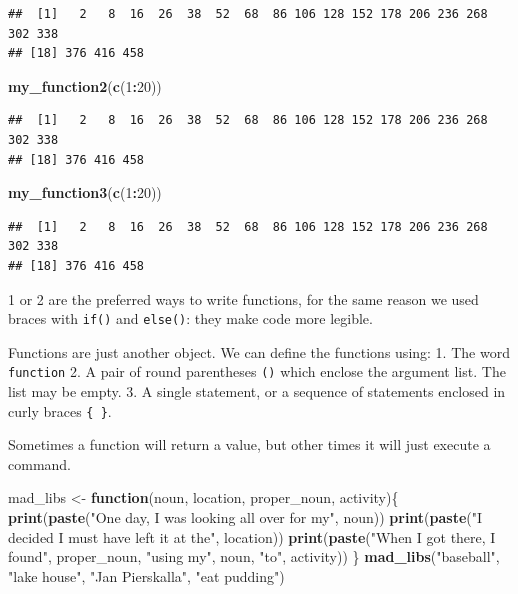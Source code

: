 \documentclass[]{article}
\newenvironment{Shaded}{\begin{snugshade}}{\end{snugshade}}
\newcommand{\KeywordTok}[1]{\textcolor[rgb]{0.13,0.29,0.53}{\textbf{#1}}}
\newcommand{\DecValTok}[1]{\textcolor[rgb]{0.00,0.00,0.81}{#1}}
\newcommand{\StringTok}[1]{\textcolor[rgb]{0.31,0.60,0.02}{#1}}
\newcommand{\ControlFlowTok}[1]{\textcolor[rgb]{0.13,0.29,0.53}{\textbf{#1}}}
\newcommand{\OperatorTok}[1]{\textcolor[rgb]{0.81,0.36,0.00}{\textbf{#1}}}
\newcommand{\NormalTok}[1]{#1}
\begin{document}
\begin{verbatim}
##  [1]   2   8  16  26  38  52  68  86 106 128 152 178 206 236 268 302 338
## [18] 376 416 458
\end{verbatim}

\begin{Shaded}
\begin{Highlighting}[]
\KeywordTok{my_function2}\NormalTok{(}\KeywordTok{c}\NormalTok{(}\DecValTok{1}\OperatorTok{:}\DecValTok{20}\NormalTok{))}
\end{Highlighting}
\end{Shaded}

\begin{verbatim}
##  [1]   2   8  16  26  38  52  68  86 106 128 152 178 206 236 268 302 338
## [18] 376 416 458
\end{verbatim}

\begin{Shaded}
\begin{Highlighting}[]
\KeywordTok{my_function3}\NormalTok{(}\KeywordTok{c}\NormalTok{(}\DecValTok{1}\OperatorTok{:}\DecValTok{20}\NormalTok{))}
\end{Highlighting}
\end{Shaded}

\begin{verbatim}
##  [1]   2   8  16  26  38  52  68  86 106 128 152 178 206 236 268 302 338
## [18] 376 416 458
\end{verbatim}

1 or 2 are the preferred ways to write functions, for the same reason we
used braces with \texttt{if()} and \texttt{else()}: they make code more
legible.

Functions are just another object. We can define the functions using: 1.
The word \texttt{function} 2. A pair of round parentheses \texttt{()}
which enclose the argument list. The list may be empty. 3. A single
statement, or a sequence of statements enclosed in curly braces
\texttt{\{\ \}}.

Sometimes a function will return a value, but other times it will just
execute a command.

\begin{Shaded}
\begin{Highlighting}[]
\NormalTok{mad_libs <-}\StringTok{ }\ControlFlowTok{function}\NormalTok{(noun, location, proper_noun, activity)\{}
  \KeywordTok{print}\NormalTok{(}\KeywordTok{paste}\NormalTok{(}\StringTok{"One day, I was looking all over for my"}\NormalTok{, noun))}
  \KeywordTok{print}\NormalTok{(}\KeywordTok{paste}\NormalTok{(}\StringTok{"I decided I must have left it at the"}\NormalTok{, location))}
  \KeywordTok{print}\NormalTok{(}\KeywordTok{paste}\NormalTok{(}\StringTok{"When I got there, I found"}\NormalTok{, proper_noun, }\StringTok{"using my"}\NormalTok{, noun, }\StringTok{"to"}\NormalTok{, activity))}
\NormalTok{\}}
\KeywordTok{mad_libs}\NormalTok{(}\StringTok{"baseball"}\NormalTok{, }\StringTok{"lake house"}\NormalTok{, }\StringTok{"Jan Pierskalla"}\NormalTok{, }\StringTok{"eat pudding"}\NormalTok{)}
\end{Highlighting}
\end{Shaded}
\end{document}
